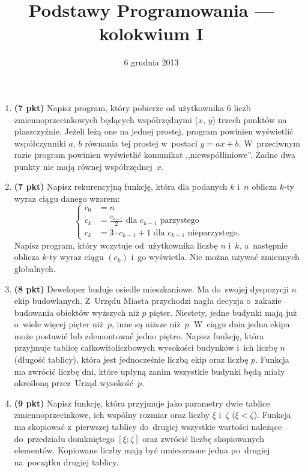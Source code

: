 \documentclass[11pt]{article}
\title{Podstawy Programowania --- kolokwium I}
\date{6 grudnia 2013}
\begin{document}
\maketitle
\DefineShortVerb{\|}
\thispagestyle{empty}
\begin{enumerate}


\item \textbf{(7 pkt)}
Napisz program, który pobierze od użytkownika 6 liczb zmiennoprzecinkowych będących współrzędnymi ($x$, $y$) trzech punktów na płaszczyźnie.
Jeżeli leżą one na jednej prostej, program powinien wyświetlić współczynniki $a$, $b$ równania tej prostej w~postaci $y=ax+b$.
W~przeciwnym razie program powinien wyświetlić komunikat ,,niewspółliniowe''. Żadne dwa punkty nie mają równej współrzędnej~$x$.

 \item \textbf{(7 pkt)}
Napisz rekurencyjną funkcję, która dla podanych $k$ i~$n$ oblicza $k$-ty wyraz ciągu danego wzorem:
$$
\begin{cases}
  c_{0} & = n \\
  c_{k} & = \frac{c_{k-1}}{2} \mbox{ dla } c_{k-1} \mbox{ parzystego} \\
  c_{k} & = 3 \cdot c_{k-1}+1 \mbox{ dla } c_{k-1} \mbox{ nieparzystego.}
\end{cases}
$$
Napisz program, który wczytuje od~użytkownika liczbę $n$ i~$k$, a~następnie oblicza $k$-ty wyraz ciągu $(c_k)$ i~go wyświetla.
Nie można używać zmiennych globalnych.

 \item \textbf{(8 pkt)}
Deweloper buduje osiedle mieszkaniowe.
Ma do~swojej dyspozycji $n$ ekip budowlanych. Z~Urzędu Miasta przychodzi nagła decyzja o~zakazie budowania obiektów wyższych niż $p$ pięter.
Niestety, jedne budynki mają już o~wiele więcej pięter niż~$p$, inne są niższe niż~$p$.
W~ciągu dnia jedna ekipa może postawić lub zdemontować jedno piętro.
Napisz funkcję, która przyjmuje tablicę całkowitoliczbowych wysokości budynków i~ich liczbę $n$ (długość tablicy), która jest jednocześnie liczbą ekip oraz liczbę $p$.
Funkcja ma zwrócić liczbę dni, które upłyną zanim wszystkie budynki będą miały określoną przez~Urząd wysokość~$p$.


 \item \textbf{(9 pkt)}
Napisz funkcję, która przyjmuje jako parametry dwie tablice zmiennoprzecinkowe, ich wspólny rozmiar oraz liczby $\xi$ i~$\zeta$ ($\xi < \zeta$).
Funkcja ma skopiować z~pierwszej tablicy do~drugiej wszystkie wartości należące do~przedziału domkniętego $[\xi; \zeta]$ oraz zwrócić liczbę skopiowanych elementów.
Kopiowane liczby mają być umieszczone jedna po~drugiej na~początku drugiej tablicy.



\end{enumerate}
\end{document}
